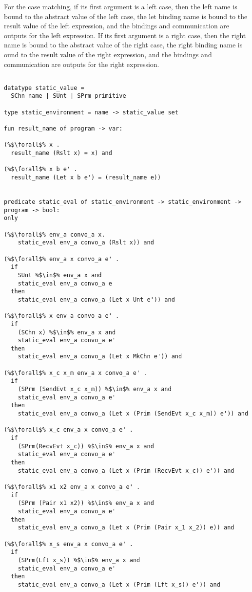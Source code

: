 \documentclass{article}
\begin{document}
For the case matching, if its first argument is a left case, then the left name is bound to the
abstract value of the left case, the let binding name is bound to the result value of the left
expression, and the bindings and communication are outputs for the left expression.  If its
first argument is a right case, then the right name is bound to the abstract value of the right
case, the right binding name is ound to the result value of the right expression, and the
bindings and communication are outputs for the right expression. 

\begin{lstlisting}[language=logic, style=codestyle1, escapechar=\%]

datatype static_value =
  SChn name | SUnt | SPrm primitive 

type static_environment = name -> static_value set

fun result_name of program -> var:

(%$\forall$% x .
  result_name (Rslt x) = x) and

(%$\forall$% x b e' . 
  result_name (Let x b e') = (result_name e))

  
predicate static_eval of static_environment -> static_environment -> program -> bool:
only

(%$\forall$% env_a convo_a x.
    static_eval env_a convo_a (Rslt x)) and

(%$\forall$% env_a x convo_a e' .
  if 
    SUnt %$\in$% env_a x and
    static_eval env_a convo_a e
  then
    static_eval env_a convo_a (Let x Unt e')) and

(%$\forall$% x env_a convo_a e' .
  if 
    (SChn x) %$\in$% env_a x and
    static_eval env_a convo_a e'
  then  
    static_eval env_a convo_a (Let x MkChn e')) and

(%$\forall$% x_c x_m env_a x convo_a e' .
  if
    (SPrm (SendEvt x_c x_m)) %$\in$% env_a x and
    static_eval env_a convo_a e' 
  then
    static_eval env_a convo_a (Let x (Prim (SendEvt x_c x_m)) e')) and

(%$\forall$% x_c env_a x convo_a e' . 
  if 
    (SPrm(RecvEvt x_c)) %$\in$% env_a x and
    static_eval env_a convo_a e'
  then
    static_eval env_a convo_a (Let x (Prim (RecvEvt x_c)) e')) and

(%$\forall$% x1 x2 env_a x convo_a e' .
  if
    (SPrm (Pair x1 x2)) %$\in$% env_a x and
    static_eval env_a convo_a e'
  then
    static_eval env_a convo_a (Let x (Prim (Pair x_1 x_2)) e)) and

(%$\forall$% x_s env_a x convo_a e' .
  if
    (SPrm(Lft x_s)) %$\in$% env_a x and
    static_eval env_a convo_a e' 
  then
    static_eval env_a convo_a (Let x (Prim (Lft x_s)) e')) and


\end{lstlisting}
\end{document}
